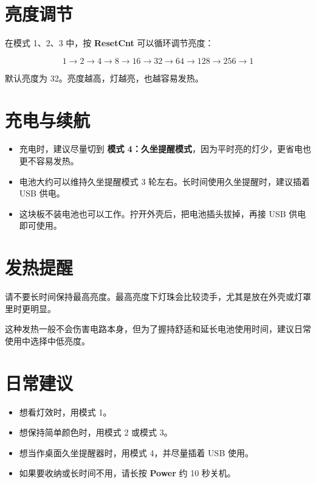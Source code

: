 \documentclass[fontset=fandol,11pt,a4paper]{ctexart}
\begin{document}
\section*{亮度调节}

在模式 1、2、3 中，按 \textbf{ResetCnt} 可以循环调节亮度：

\[
1 \rightarrow 2 \rightarrow 4 \rightarrow 8 \rightarrow 16 \rightarrow 32
\rightarrow 64 \rightarrow 128 \rightarrow 256 \rightarrow 1
\]

默认亮度为 32。亮度越高，灯越亮，也越容易发热。

\section*{充电与续航}

\begin{itemize}
  \item 充电时，建议尽量切到 \textbf{模式 4：久坐提醒模式}，因为平时亮的灯少，更省电也更不容易发热。
  \item 电池大约可以维持久坐提醒模式 3 轮左右。长时间使用久坐提醒时，建议插着 USB 供电。
  \item 这块板不装电池也可以工作。拧开外壳后，把电池插头拔掉，再接 USB 供电即可使用。
\end{itemize}

\section*{发热提醒}

请不要长时间保持最高亮度。最高亮度下灯珠会比较烫手，尤其是放在外壳或灯罩里时更明显。

这种发热一般不会伤害电路本身，但为了握持舒适和延长电池使用时间，建议日常使用中选择中低亮度。

\section*{日常建议}

\begin{itemize}
  \item 想看灯效时，用模式 1。
  \item 想保持简单颜色时，用模式 2 或模式 3。
  \item 想当作桌面久坐提醒器时，用模式 4，并尽量插着 USB 使用。
  \item 如果要收纳或长时间不用，请长按 \textbf{Power} 约 10 秒关机。
\end{itemize}
\end{document}

